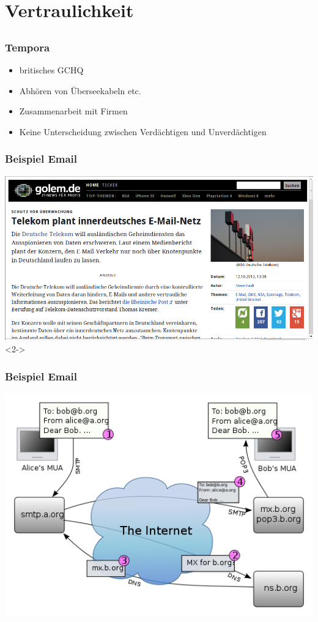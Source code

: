\documentclass[12pt]{beamer}
\begin{document}
\section{Vertraulichkeit}
\subsection{}

\begin{frame}
    \frametitle{Tempora}
    \begin{itemize}
      \item<2-> britisches GCHQ
      \item<3-> Abhören von Überseekabeln etc.
      \item<4-> Zusammenarbeit mit Firmen
      \item<5-> Keine Unterscheidung zwischen Verdächtigen und Unverdächtigen
    \end{itemize}
\end{frame}

\begin{frame}
    \frametitle{Beispiel Email}
    \includegraphics[height=0.7\textheight]{img/telekom_mail.png}<2->
\end{frame}

\begin{frame}
    \frametitle{Beispiel Email}
    \includegraphics[height=0.7\textheight]{img/527px-Email.png}
\end{frame}
\end{document}
